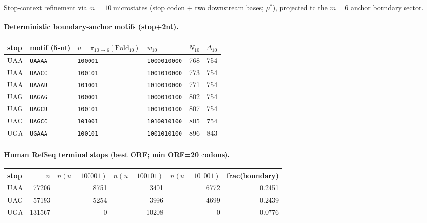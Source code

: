 Stop-context refinement via $m=10$ microstates (stop codon + two downstream bases; $\mu^\ast$), projected to the $m=6$ anchor boundary sector.

\paragraph{Deterministic boundary-anchor motifs (stop+2nt).}
\begin{center}
\small
\setlength{\tabcolsep}{6pt}
\renewcommand{\arraystretch}{1.15}
\begin{tabular}{l l l l r r}
\toprule
stop & motif (5-nt) & $u=\pi_{10\to 6}(\mathrm{Fold}_{10})$ & $w_{10}$ & $N_{10}$ & $\Delta_{10}$ \\
\midrule
UAA & \texttt{UAAAA} & \texttt{100001} & \texttt{1000010000} & 768 & 754 \\
UAA & \texttt{UAACC} & \texttt{100101} & \texttt{1001010000} & 773 & 754 \\
UAA & \texttt{UAAAU} & \texttt{101001} & \texttt{1010010000} & 771 & 754 \\
UAG & \texttt{UAGAG} & \texttt{100001} & \texttt{1000010100} & 802 & 754 \\
UAG & \texttt{UAGCU} & \texttt{100101} & \texttt{1001010100} & 807 & 754 \\
UAG & \texttt{UAGCC} & \texttt{101001} & \texttt{1010010100} & 805 & 754 \\
UGA & \texttt{UGAAA} & \texttt{100101} & \texttt{1001010100} & 896 & 843 \\
\bottomrule
\end{tabular}
\end{center}

\paragraph{Human RefSeq terminal stops (best ORF; min ORF=20 codons).}
\begin{center}
\small
\setlength{\tabcolsep}{6pt}
\renewcommand{\arraystretch}{1.15}
\begin{tabular}{l r r r r r}
\toprule
stop & $n$ & $n(u=100001)$ & $n(u=100101)$ & $n(u=101001)$ & frac(boundary) \\
\midrule
UAA & 77206 & 8751 & 3401 & 6772 & 0.2451 \\
UAG & 57193 & 5254 & 3996 & 4699 & 0.2439 \\
UGA & 131567 & 0 & 10208 & 0 & 0.0776 \\
\bottomrule
\end{tabular}
\end{center}

